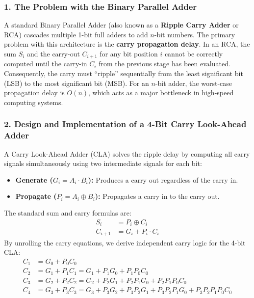 \documentclass[12pt,a3paper]{article}
\begin{document}
\begin{enumerate}
\begin{tcolorbox}[enhanced,breakable,ansbox,colback=cD!4,colframe=cD,boxrule=0.8pt,arc=5pt,title={\textbf{Answer}},fonttitle=\bfseries\color{white},colbacktitle=cD]

\subsubsection*{1. The Problem with the Binary Parallel Adder}

A standard Binary Parallel Adder (also known as a \textbf{Ripple Carry Adder} or RCA) cascades multiple 1-bit full adders to add $n$-bit numbers. The primary problem with this architecture is the \textbf{carry propagation delay}. 
In an RCA, the sum $S_i$ and the carry-out $C_{i+1}$ for any bit position $i$ cannot be correctly computed until the carry-in $C_i$ from the previous stage has been evaluated. Consequently, the carry must ``ripple'' sequentially from the least significant bit (LSB) to the most significant bit (MSB). For an $n$-bit adder, the worst-case propagation delay is $O(n)$, which acts as a major bottleneck in high-speed computing systems.

\vspace{0.3cm}
\subsubsection*{2. Design and Implementation of a 4-Bit Carry Look-Ahead Adder}

A Carry Look-Ahead Adder (CLA) solves the ripple delay by computing all carry signals simultaneously using two intermediate signals for each bit:
\begin{itemize}
    \item \textbf{Generate ($G_i = A_i \cdot B_i$):} Produces a carry out regardless of the carry in.
    \item \textbf{Propagate ($P_i = A_i \oplus B_i$):} Propagates a carry in to the carry out.
\end{itemize}
The standard sum and carry formulas are:
\begin{align*}
    S_i &= P_i \oplus C_i \\
    C_{i+1} &= G_i + P_i \cdot C_i
\end{align*}
By unrolling the carry equations, we derive independent carry logic for the 4-bit CLA:
\begin{align*}
    C_1 &= G_0 + P_0C_0 \\
    C_2 &= G_1 + P_1C_1 = G_1 + P_1G_0 + P_1P_0C_0 \\
    C_3 &= G_2 + P_2C_2 = G_2 + P_2G_1 + P_2P_1G_0 + P_2P_1P_0C_0 \\
    C_4 &= G_3 + P_3C_3 = G_3 + P_3G_2 + P_3P_2G_1 + P_3P_2P_1G_0 + P_3P_2P_1P_0C_0
\end{align*}


\end{tcolorbox}
\end{enumerate}
\end{document}
